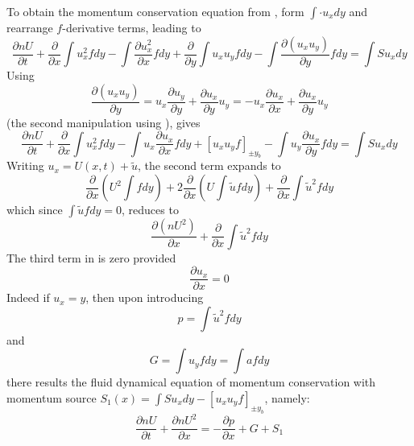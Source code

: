 To obtain the momentum conservation equation from , form $\int \cdot u_x dy$ and rearrange
$f$-derivative terms, leading to
\begin{equation}\label{eq:momconkin}
 \frac{\partial  nU}{\partial t}  +  \frac{\partial}{\partial x} \int u_x^2 f dy- \int \frac{\partial u_x^2}{\partial x} f dy+  \frac{\partial}{\partial y} \int u_x u_y f dy- \int  \frac{\partial (u_x u_y)}{\partial y} f dy= \int S u_x dy
\end{equation}
Using 
\begin{equation}
\frac{\partial (u_x u_y)}{\partial y} =  u_x \frac{\partial  u_y}{\partial y} +   \frac{\partial u_x}{\partial y} u_y = -  u_x  \frac{\partial  u_x}{\partial x} +   \frac{\partial u_x}{\partial y} u_y
\end{equation}
(the second manipulation using ),  gives
\begin{equation}\label{eq:momcons2}
\frac{\partial  nU}{\partial t}  +  \frac{\partial}{\partial x} \int u_x^2 f dy-  \int u_x  \frac{\partial u_x}{\partial x} f dy+ [ u_x u_y f ]_{\pm y_b}  - \int u_y  \frac{\partial u_x}{\partial y} f dy= \int S u_x dy
\end{equation}
Writing $u_x =U(x,t) + \tilde{u}$, the second term expands to
\begin{equation}
 \frac{\partial}{\partial x} ( U^2 \int f dy) + 2  \frac{\partial}{\partial x} (U \int \tilde{u} f dy) +  \frac{\partial}{\partial x} \int \tilde{u}^2 f dy
\end{equation}
which since $\int \tilde{u} f dy=0$, reduces to 
\begin{equation}\label{eq:term2}
  \frac{\partial  (n U^2)}{\partial x}  +   \frac{\partial}{\partial x} \int \tilde{u}^2 f dy
\end{equation}
The third term in  is zero provided
\begin{equation}
 \frac{\partial u_x}{\partial x} = 0
\end{equation}
Indeed if $u_x=y$, then upon  introducing
\begin{equation}
p= \int \tilde{u}^2 f dy
\end{equation}
and
\begin{equation}
G= \int u_y f dy = \int a f dy
\end{equation}
there results the fluid dynamical equation of momentum conservation with momentum source $S_1(x)= \int S u_x dy-[ u_x u_y f ]_{\pm y_b}$,
namely:
\begin{equation}\label{eq:momcon}
 \frac{\partial nU}{\partial t}  +  \frac{\partial  nU^2}{\partial x} = -  \frac{\partial p}{\partial x} + G + S_1
\end{equation}

